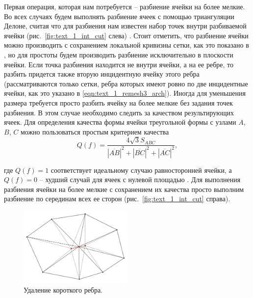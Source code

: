 Первая операция, которая нам потребуется -- разбиение ячейки на более мелкие.
Во всех случаях будем выполнять разбиение ячеек с помощью триангуляции Делоне, считая что для разбиения нам известен набор точек внутри разбиваемой ячейки (рис.~\ref{fig:text_1_int_cut} слева) \cite{Rivara2019Delaunay}.
Стоит отметить, что разбиение ячейки можно производить с сохранением локальной кривизны сетки, как это показано в \cite{Rakotoarivelo2019Remesh}, но для простоты будем производить разбиение исключительно в плоскости ячейки.
Если точка разбиения находится не внутри ячейки, а на ее ребре, то разбить придется также вторую инцидентную ячейку этого ребра (рассматриваются только сетки, ребра которых имеют ровно по две инцидентные ячейки, как это указано в \eqref{eqn:text_1_remesh3_arch}).
Иногда для уменьшения размера требуется просто разбить ячейку на более мелкие без задания точек разбиения.
В этом случае необходимо следить за качеством результирующих ячеек.
Для определения качества формы ячейки треугольной формы с узлами $A$, $B$, $C$ можно пользоваться простым критерием качества
\begin{equation}
Q(f) = \frac{4\sqrt{3} S_{ABC}}{|\overline{AB}|^2 + |\overline{BC}|^2 + |\overline{AC}|^2},
\end{equation}

где $Q(f) = 1$ соответствует идеальному случаю равносторонней ячейки, а $Q(f) = 0$ -- худший случай для ячеек с нулевой площадью \cite{Borouchaki2000Remesh}.
Для выполнения разбиения ячейки на более мелкие с сохранением их качества просто выполним разбиение по серединам всех ее сторон (рис.~\ref{fig:text_1_int_cut} справа).

\begin{figure}[h]
\centering
\includegraphics[width=0.5\textwidth]{pics/text_1_int/pic_reduce_edge.pdf}
\caption{Удаление короткого ребра.}\label{fig:text_1_int_reduce_edge}
\end{figure}

